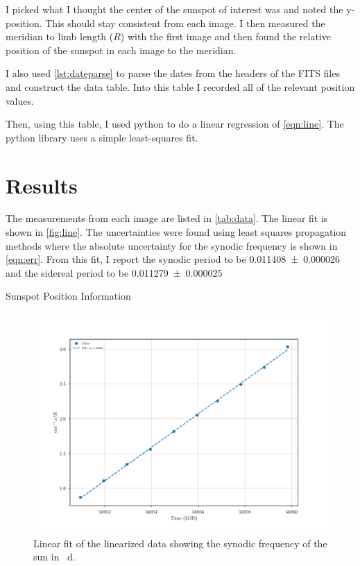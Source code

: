 \documentclass[%
aip,
jmp,
reprint,
floatfix,
]{revtex4-1}
\begin{document}
	I picked what I thought the center of the sunspot of interest was and noted the y-position. This should stay consistent from each image. I then measured the meridian to limb length ($R$) with the first image and then found the relative position of the sunspot in each image to the meridian. 
	
	I also used \autoref{lst:dateparse} to parse the dates from the headers of the FITS files and construct the data table. Into this table I recorded all of the relevant position values. 
	
	Then, using this table, I used python to do a linear regression of \autoref{eqn:line}. The python library uses a simple least-squares fit. 
	

	\section{Results}
	
	The measurements from each image are listed in \autoref{tab:data}. The linear fit is shown in \autoref{fig:line}. The uncertainties were found using least squares propagation methods where the absolute uncertainty for the synodic frequency is shown in \autoref{eqn:err}. From this fit, I report the synodic period to be \SI{.011408 \pm .000026}{\year} and the sidereal period to be \SI{.011279 \pm .000025}{\year}

	\begin{table}
		\centering
		\caption{Sunspot Position Information}
		\label{tab:data}
	\end{table}

	\begin{figure}[t]
		\centering
		\includegraphics[width=.8\linewidth]{figs/fit.pdf}
		\caption{Linear fit of the linearized data showing the synodic frequency of the sun in \si{\per\day}.}
		\label{fig:line}
	\end{figure}
\end{document}

